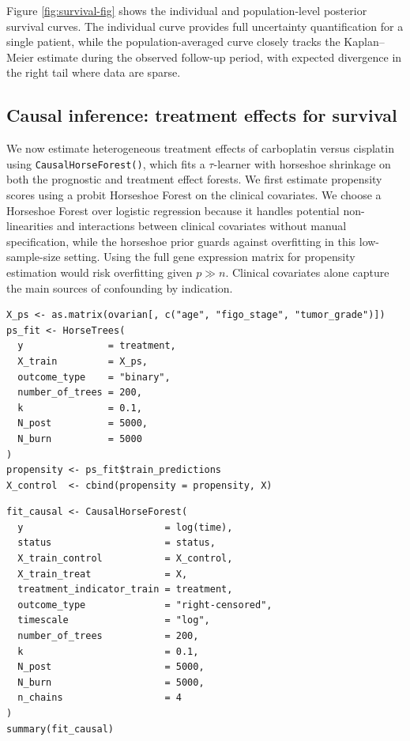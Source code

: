 Figure \ref{fig:survival-fig} shows the individual and population-level posterior survival curves. The individual curve provides full uncertainty quantification for a single patient, while the population-averaged curve closely tracks the Kaplan--Meier estimate during the observed follow-up period, with expected divergence in the right tail where data are sparse.

\subsection{Causal inference: treatment effects for survival}\label{causal-inference-treatment-effects-for-survival}

We now estimate heterogeneous treatment effects of carboplatin versus cisplatin using \texttt{CausalHorseForest()}, which fits a \(\tau\)-learner with horseshoe shrinkage on both the prognostic and treatment effect forests. We first estimate propensity scores using a probit Horseshoe Forest on the clinical covariates. We choose a Horseshoe Forest over logistic regression because it handles potential non-linearities and interactions between clinical covariates without manual specification, while the horseshoe prior guards against overfitting in this low-sample-size setting. Using the full gene expression matrix for propensity estimation would risk overfitting given \(p \gg n\). Clinical covariates alone capture the main sources of confounding by indication.

\begin{verbatim}
X_ps <- as.matrix(ovarian[, c("age", "figo_stage", "tumor_grade")])
ps_fit <- HorseTrees(
  y               = treatment,
  X_train         = X_ps,
  outcome_type    = "binary",
  number_of_trees = 200,
  k               = 0.1,
  N_post          = 5000,
  N_burn          = 5000
)
propensity <- ps_fit$train_predictions
X_control  <- cbind(propensity = propensity, X)
\end{verbatim}

\begin{verbatim}
fit_causal <- CausalHorseForest(
  y                         = log(time),
  status                    = status,
  X_train_control           = X_control,
  X_train_treat             = X,
  treatment_indicator_train = treatment,
  outcome_type              = "right-censored",
  timescale                 = "log",
  number_of_trees           = 200,
  k                         = 0.1,
  N_post                    = 5000,
  N_burn                    = 5000,
  n_chains                  = 4
)
summary(fit_causal)
\end{verbatim}

